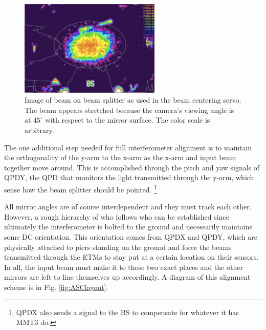 \begin{figure} 
\begin{centering} \includegraphics[width=0.6\textwidth]{figures/BCSspiricon.pdf} 
\caption[Beam centering servo image of beam splitter]{Image of beam on beam splitter as used in the beam centering servo. The beam appears stretched because the camera's viewing angle is at $45^{\circ}$ with respect to the mirror surface. The color scale is arbitrary.}
\label{fig:BCS}
\end{centering}
\end{figure}

The one additional step needed for full interferometer alignment is to maintain the orthogonality of the y-arm to the x-arm as the x-arm and input beam together move around. This is accomplished through the pitch and yaw signals of QPDY, the QPD that monitors the light transmitted through the y-arm, which sense how the beam splitter should be pointed. \footnote{QPDX also sends a signal to the BS to compensate for whatever it has MMT3 do.}

All mirror angles are of course interdependent and they must track each other. However, a rough hierarchy of who follows who can be established since ultimately the interferometer is bolted to the ground and necessarily maintains some DC orientation. This orientation comes from QPDX and QPDY, which are physically attached to piers standing on the ground and force the beams transmitted through the ETMs to stay put at a certain location on their sensors. In all, the input beam must make it to those two exact places and the other mirrors are left to line themselves up accordingly. A diagram of this alignment scheme is in Fig. \ref{fig:ASClayout}.


